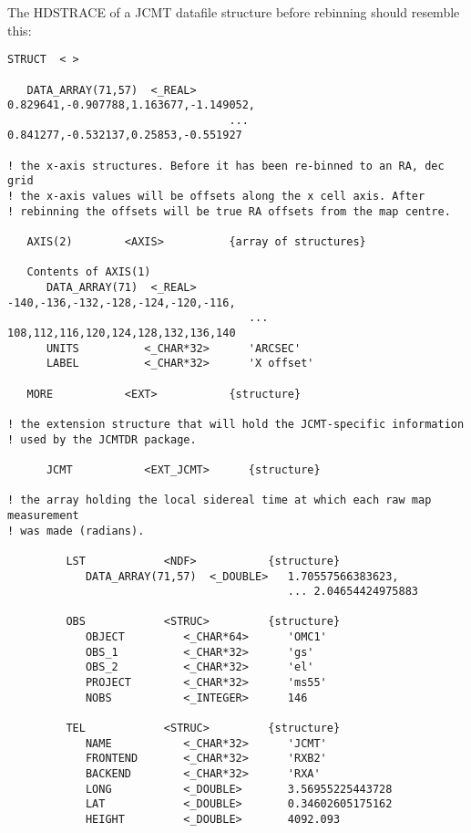 \documentclass[twoside,11pt]{article}
\renewcommand{\_}{\texttt{\symbol{95}}}
\begin{document}
The HDSTRACE of a JCMT datafile structure before rebinning should
resemble this:
\begin{small}
\begin{verbatim}
STRUCT  < >

   DATA_ARRAY(71,57)  <_REAL>     0.829641,-0.907788,1.163677,-1.149052,
                                  ... 0.841277,-0.532137,0.25853,-0.551927

! the x-axis structures. Before it has been re-binned to an RA, dec grid
! the x-axis values will be offsets along the x cell axis. After
! rebinning the offsets will be true RA offsets from the map centre.

   AXIS(2)        <AXIS>          {array of structures}

   Contents of AXIS(1)
      DATA_ARRAY(71)  <_REAL>        -140,-136,-132,-128,-124,-120,-116,
                                     ... 108,112,116,120,124,128,132,136,140
      UNITS          <_CHAR*32>      'ARCSEC'
      LABEL          <_CHAR*32>      'X offset'

   MORE           <EXT>           {structure}

! the extension structure that will hold the JCMT-specific information
! used by the JCMTDR package.

      JCMT           <EXT_JCMT>      {structure}

! the array holding the local sidereal time at which each raw map measurement
! was made (radians).

         LST            <NDF>           {structure}
            DATA_ARRAY(71,57)  <_DOUBLE>   1.70557566383623,
                                           ... 2.04654424975883

         OBS            <STRUC>         {structure}
            OBJECT         <_CHAR*64>      'OMC1'
            OBS_1          <_CHAR*32>      'gs'
            OBS_2          <_CHAR*32>      'el'
            PROJECT        <_CHAR*32>      'ms55'
            NOBS           <_INTEGER>      146

         TEL            <STRUC>         {structure}
            NAME           <_CHAR*32>      'JCMT'
            FRONTEND       <_CHAR*32>      'RXB2'
            BACKEND        <_CHAR*32>      'RXA'
            LONG           <_DOUBLE>       3.56955225443728
            LAT            <_DOUBLE>       0.34602605175162
            HEIGHT         <_DOUBLE>       4092.093


\end{verbatim}
\end{small}
\end{document}

